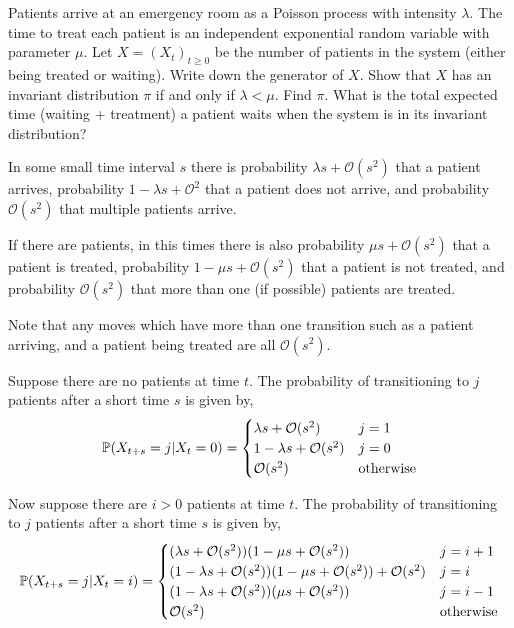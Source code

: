 \begin{problem}[Exercise 5.1]
Patients arrive at an emergency room as a Poisson process with intensity \( \lambda \). The time to treat each patient is an independent exponential random variable with parameter \( \mu \). Let \( X= (X_t)_{t\geq 0} \) be the number of patients in the system (either being treated or waiting). Write down the generator of \( X \). Show that \( X \) has an invariant distribution \( \pi \) if and only if \( \lambda<\mu \). Find \( \pi \). What is the total expected time (waiting + treatment) a patient waits when the system is in its invariant distribution?
\end{problem}

\begin{solution}[Solution]
In some small time interval \( s \) there is probability \( \lambda s + \mathcal{O}(s^2) \) that a patient arrives, probability \( 1-\lambda s + \mathcal{O}^2 \) that a patient does not arrive, and probability \( \mathcal{O}(s^2) \) that multiple patients arrive.

If there are patients, in this times there is also probability \( \mu s + \mathcal{O}(s^2) \) that a patient is treated, probability \( 1- \mu s + \mathcal{O}(s^2) \) that a patient is not treated, and probability \( \mathcal{O}(s^2) \) that more than one (if possible) patients are treated.

Note that any moves which have more than one transition such as a patient arriving, and a patient being treated are all \( \mathcal{O}(s^2) \).

Suppose there are no patients at time \( t \). The probability of transitioning to \( j \) patients after a short time \( s \) is given by,
\begin{align*}
    \mathbb{P}(X_{t+s} = j | X_{t} = 0) = 
    \begin{cases}
        \lambda s + \mathcal{O}(s^2) & j=1 \\
        1-\lambda s + \mathcal{O}(s^2) & j=0 \\
        \mathcal{O}(s^2) & \text{otherwise}
    \end{cases}
\end{align*}

Now suppose there are \( i>0 \) patients at time \( t \). The probability of transitioning to \( j \) patients after a short time \( s \) is given by,
\begin{align*}
    \mathbb{P}(X_{t+s} = j | X_{t} = i) = 
    \begin{cases}
        (\lambda s + \mathcal{O}(s^2))(1-\mu s + \mathcal{O}(s^2)) & j=i+1 \\
        (1-\lambda s + \mathcal{O}(s^2))(1-\mu s + \mathcal{O}(s^2)) + \mathcal{O}(s^2) & j=i \\
        (1-\lambda s + \mathcal{O}(s^2))(\mu s + \mathcal{O}(s^2)) & j=i-1 \\
        \mathcal{O}(s^2) & \text{otherwise}
    \end{cases}
\end{align*}


\end{solution}
